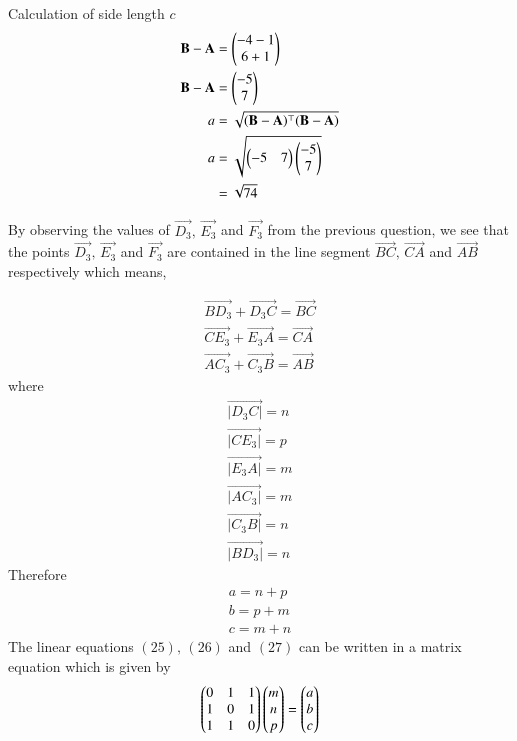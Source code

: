 \documentclass[journal,12pt,twocolumn]{IEEEtran}
\theoremstyle{remark}
\begin{document}
\vspace{0.3cm}
Calculation of side length $c$
\begin{align}
\mathbf{B}-\mathbf{A} &= \begin{pmatrix}-4-1\\6+1\end{pmatrix}\\
\mathbf{B}-\mathbf{A} &= \begin{pmatrix}-5\\7\end{pmatrix}\\
a &= \sqrt{(\mathbf{B}-\mathbf{A})^{\top}(\mathbf{B}-\mathbf{A})}\\
a &= \sqrt{\begin{pmatrix}-5&7\end{pmatrix}\begin{pmatrix}-5\\7\end{pmatrix}}\\
&= \sqrt{74}
\end{align}

\vspace{0.3cm}
By observing the values of $\vec{D_3},\, \vec{E_3}$ and $\vec{F_3}$ from the previous question, we see that the points $\vec{D_3},\, \vec{E_3}$ and $\vec{F_3}$ are contained in the line segment $\vec{BC}, \, \vec{CA}$ and $\vec{AB}$ respectively which means,

\begin{align}
\vec{BD_3} + \vec{D_{3}C} = \vec{BC}\\
\vec{CE_3} + \vec{E_{3}A} = \vec{CA}\\
\vec{AC_3} + \vec{C_{3}B} = \vec{AB}
\end{align}
where
\begin{align}
\vec{|D_3C|}=n \\
\vec{|CE_3|}=p \\
\vec{|E_{3}A|}=m \\
\vec{|AC_{3}|}=m\\
\vec{|C_{3}B|}=n\\
\vec{|BD_{3}|}=n
\end{align}
Therefore
\begin{align}
a = n+p\\
b = p+m\\
c = m+n
\end{align}
The linear equations $(25),\,(26)$ and $(27)$ can be written in a matrix equation which is given by
\begin{align}
\begin{pmatrix}0&1&1\\1&0&1\\1&1&0\end{pmatrix}\begin{pmatrix}m\\n\\p\end{pmatrix} = \begin{pmatrix}a\\b\\c\end{pmatrix}
\end{align}
\end{document}

